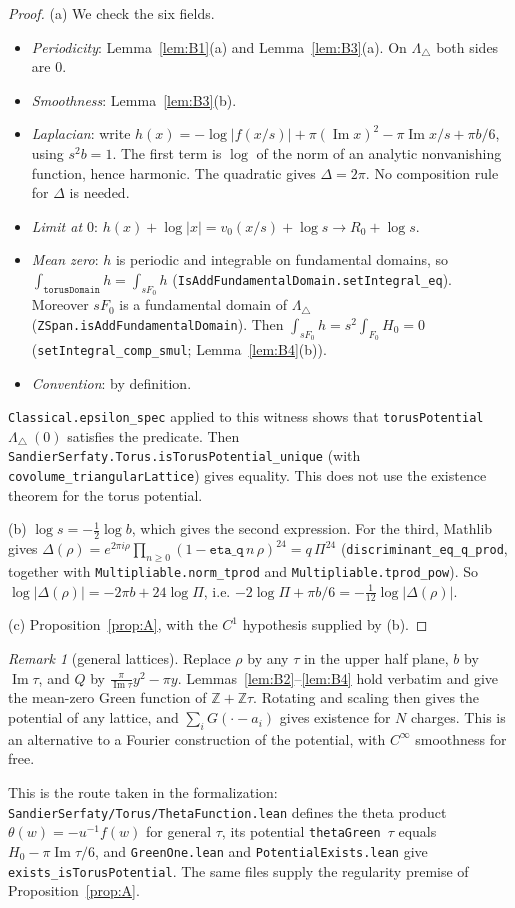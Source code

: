 \documentclass[11pt]{article}
\theoremstyle{definition}
\theoremstyle{remark}
\newtheorem{remark}[theorem]{Remark}
\newcommand{\Z}{\mathbb Z}
\newcommand{\Ltri}{\Lambda_{\triangle}}
\newcommand{\lean}[1]{\texttt{#1}}
\DeclareMathOperator{\Imag}{Im}
\begin{document}
\begin{proof}
(a) We check the six fields.
\begin{itemize}
\item \emph{Periodicity}: Lemma~\ref{lem:B1}(a) and Lemma~\ref{lem:B3}(a). On $\Ltri$ both sides are $0$.
\item \emph{Smoothness}: Lemma~\ref{lem:B3}(b).
\item \emph{Laplacian}: write $h(x)=-\log|f(x/s)|+\pi(\Imag x)^2-\pi\Imag x/s+\pi b/6$, using $s^2b=1$. The first
term is $\log$ of the norm of an analytic nonvanishing function, hence harmonic. The quadratic gives
$\Delta=2\pi$. No composition rule for $\Delta$ is needed.
\item \emph{Limit at $0$}: $h(x)+\log|x|=v_0(x/s)+\log s\to R_0+\log s$.
\item \emph{Mean zero}: $h$ is periodic and integrable on fundamental domains, so
$\int_{\lean{torusDomain}}h=\int_{sF_0}h$ (\lean{IsAddFundamentalDomain.setIntegral\_eq}). Moreover $sF_0$ is a
fundamental domain of $\Ltri$ (\lean{ZSpan.isAddFundamentalDomain}). Then
$\int_{sF_0}h=s^2\int_{F_0}H_0=0$ (\lean{setIntegral\_comp\_smul};
Lemma~\ref{lem:B4}(b)).
\item \emph{Convention}: by definition.
\end{itemize}
\lean{Classical.epsilon\_spec} applied to this witness shows that \lean{torusPotential}\ $\Ltri\ (0)$ satisfies
the predicate. Then \lean{SandierSerfaty.Torus.isTorusPotential\_unique} (with
\lean{covolume\_triangularLattice}) gives equality. This does not use the existence theorem for the torus potential.

(b) $\log s=-\tfrac12\log b$, which gives the second expression. For the third, Mathlib gives
$\Delta(\rho)=e^{2\pi i\rho}\prod_{n\ge0}(1-\lean{eta\_q}\,n\,\rho)^{24}=q\,\Pi^{24}$
(\lean{discriminant\_eq\_q\_prod}, together with \lean{Multipliable.norm\_tprod} and
\lean{Multipliable.tprod\_pow}). So $\log|\Delta(\rho)|=-2\pi b+24\log\Pi$, i.e.
$-2\log\Pi+\pi b/6=-\frac1{12}\log|\Delta(\rho)|$.

(c) Proposition~\ref{prop:A}, with the $C^1$ hypothesis supplied by (b).
\end{proof}

\begin{remark}[general lattices]\label{rem:wp2}
Replace $\rho$ by any $\tau$ in the upper half plane, $b$ by $\Imag\tau$, and $Q$ by $\frac{\pi}{\Imag\tau}y^2-\pi y$.
Lemmas~\ref{lem:B2}--\ref{lem:B4} hold verbatim and give the mean-zero Green function of $\Z+\Z\tau$. Rotating and
scaling then gives the potential of any lattice, and $\sum_iG(\cdot-a_i)$ gives existence for $N$ charges. This is an
alternative to a Fourier construction of the potential, with $C^\infty$ smoothness for free.

This is the route taken in the formalization: \lean{SandierSerfaty/Torus/ThetaFunction.lean} defines the theta product
$\theta(w)=-u^{-1}f(w)$ for general $\tau$, its potential \lean{thetaGreen}\ $\tau$ equals $H_0-\pi\Imag\tau/6$, and
\lean{GreenOne.lean} and \lean{PotentialExists.lean} give \lean{exists\_isTorusPotential}. The same files
supply the regularity premise of Proposition~\ref{prop:A}.
\end{remark}
\end{document}
